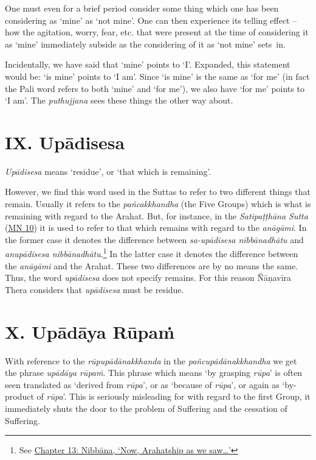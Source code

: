 One must even for a brief period consider some thing which one has been considering as `mine' as `not mine'. One can then experience its telling effect -- how the agitation, worry, fear, etc. that were present at the time of considering it as `mine' immediately subside as the considering of it as `not mine' sets~in.

Incidentally, we have said that `mine' points to `I'. Expanded, this statement would be: `is mine' points to `I am'. Since `is mine' is the same as `for me' (in fact the Pali word  refers to both `mine' and `for me'), we also have `for me' points to `I am'. The \emph{puthujjana} sees these things the other way about.

\section{IX. Upādisesa}

\emph{Upādisesa} means `residue', or `that which is remaining'.

However, we find this word used in the Suttas to refer to two different things that remain. Usually it refers to the \emph{pañcakkhandha} (the Five Groups) which is what is remaining with regard to the Arahat. But, for instance, in the \emph{Satipaṭṭhāna Sutta} (\href{https://suttacentral.net/mn10/en/sujato}{MN 10}) it is used to refer to that which remains with regard to the \emph{anāgāmi}. In the former case it denotes the difference between \emph{sa-upādisesa nibbānadhātu} and \emph{anupādisesa nibbānadhātu}.\footnote{See \href{ch-13-nibbana.xml\#remainder}{Chapter 13: Nibbāna, `Now, Arahatship as we saw\ldots\hspace{0pt}'}} In the latter case it denotes the difference between the \emph{anāgāmi} and the Arahat. These two differences are by no means the same. Thus, the word \emph{upādisesa} does not specify  remains. For this reason Ñāṇavīra Thera considers that \emph{upādisesa} must be  residue.

\section{X. Upādāya Rūpaṁ}

With reference to the \emph{rūpupādānakkhanda} in the \emph{pañcupādānakkhandha} we get the phrase \emph{upādāya rūpaṁ}. This phrase which means `by grasping \emph{rūpa}' is often seen translated as `derived from \emph{rūpa}', or as `because of \emph{rūpa}', or again as `by-product of \emph{rūpa}'. This is seriously misleading for with regard to the first Group, it immediately shuts the door to the problem of Suffering and the cessation of Suffering.

